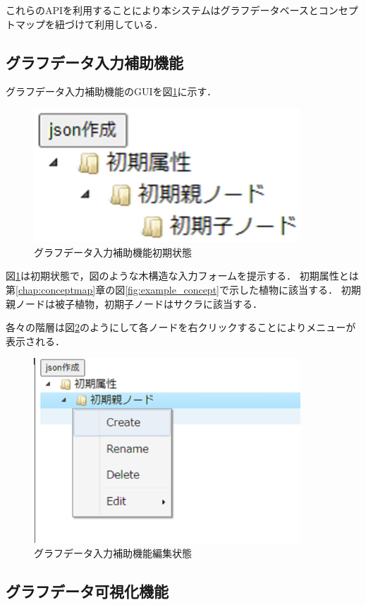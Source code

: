 これらのAPIを利用することにより本システムはグラフデータベースとコンセプトマップを紐づけて利用している．
\newpage

\subsection{グラフデータ入力補助機能}\label{subsec:hojo}

グラフデータ入力補助機能のGUIを図\ref{fig:hojo}に示す．

\begin{figure}[htbp]
\begin{center}
\includegraphics[width=10cm]{img/hojo.eps}
\end{center}
\caption{グラフデータ入力補助機能初期状態}
\label{fig:hojo}
\end{figure}

図\ref{fig:hojo}は初期状態で，図のような木構造な入力フォームを提示する．
初期属性とは第\ref{chap:conceptmap}章の図\ref{fig:example_concept}で示した植物に該当する．
初期親ノードは被子植物，初期子ノードはサクラに該当する．

各々の階層は図\ref{fig:hojo_change_name}のようにして各ノードを右クリックすることによりメニューが表示される．

\begin{figure}[htbp]
\begin{center}
\includegraphics[width=10cm]{img/hojo_change_name.eps}
\end{center}
\caption{グラフデータ入力補助機能編集状態}
\label{fig:hojo_change_name}
\end{figure}

\subsection{グラフデータ可視化機能}\label{subsec:kasi}

